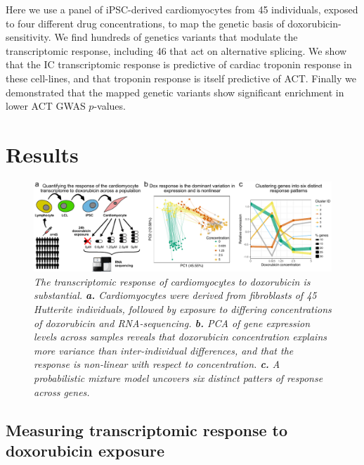 \documentclass{article}
\begin{document}
{Here we use a panel of iPSC-derived cardiomyocytes from 45 individuals, exposed to four different drug concentrations, to map the genetic basis of doxorubicin-sensitivity. We find hundreds of genetics variants that modulate the  transcriptomic response, including 46 that act on alternative splicing. We show that the IC transcriptomic response is predictive of cardiac troponin response in these cell-lines, and that troponin response is itself predictive of ACT. Finally we demonstrated that the mapped genetic variants show significant enrichment in lower ACT GWAS $p$-values. 

\section*{Results}

\begin{figure}
\begin{center}
    \includegraphics[width=1\textwidth]{../figures/fig1.pdf} 
        \caption{\it{The transcriptomic response of cardiomyocytes to doxorubicin is substantial. \textbf{a.} Cardiomyocytes were derived from fibroblasts of 45 Hutterite individuals, followed by exposure to differing concentrations of doxorubicin and RNA-sequencing. \textbf{b.} PCA of gene expression levels across samples reveals that doxorubicin concentration explains more variance than inter-individual differences, and that the response is non-linear with respect to concentration. \textbf{c.} A probabilistic mixture model uncovers six distinct patters of response across genes.}}
    \label{fig1}
    \end{center}
\end{figure}

\subsection*{Measuring transcriptomic response to doxorubicin exposure}

}
\end{document}
